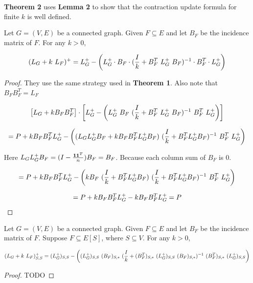 \textbf{Theorem 2} uses \textbf{Lemma 2} to show that the contraction update formula for finite $k$ is well defined. 

\begin{HXt}
 Let $G = (V, E)$ be a connected graph. Given $F \subseteq E$ and let $B_F$ be the incidence matrix of $F$. For any $k > 0$,
 
 $$ (L_G + k \ L_F)^+ = \laplacian - \left(\laplacian \cdot B_F \cdot (\frac{I}{k} + B_F^T \ \laplacian \ B_F)^{-1} \cdot B_F^T \cdot \laplacian \right)$$
 
\end{HXt}

\begin{proof}
 They use the same strategy used in \textbf{Theorem 1}. Also note that $B_F B_F^T = L_F$
 
 $$\left[L_G + k B_F B_F^T \right] \cdot \left[\laplacian - \left(\laplacian \  B_F \  (\frac{I}{k} + B_F^T \ \laplacian \ B_F)^{-1} \  B_F^T \  \laplacian \right) \right]$$

 
$$= P + k B_F B_F^T L_{G}^{+} - \left( (L_GL_{G}^{+} B_F + kB_F B_F^T L_{G}^{+} B_F)\ (\frac{I}{k} + B_F^T L_{G}^{+} B_F)^{-1} \ B_F^T \ L_{G}^{+} \right)$$

Here $L_G L_{G}^{+} B_F = (I - \frac{\textbf{1} \textbf{1}^T}{n}) B_F = B_F$. Because each column sum of $B_F$ is 0.

$$ = P + k B_F B_F^T L_{G}^{+} - \left( k B_F \ (\frac{I}{k} + B_F^T L_{G}^{+} B_F) \ (\frac{I}{k} + B_F^T L_{G}^{+} B_F)^{-1} \ B_F^T \ L_{G}^{+} \right)$$ 

$$ = P + k B_F B_F^T L_{G}^{+} - k B_F B_F^T L_{G}^{+}  = P$$
 
 \end{proof}


\begin{HXc}
 Let $G = (V, E)$ be a connected graph. Given $F \subseteq E$ and let $B_F$ be the incidence matrix of $F$. Suppose $F \subseteq E[S]$, where $S \subseteq V$. For any $k > 0$,
 
  $$ (L_G + k \ L_F)^+_{S,S} = (L_{G}^{+})_{S,S} - \left((L_{G}^{+})_{S,S} \  (B_F)_{S,*} \  (\frac{I}{k} + (B_F^T)_{S,*} \ (L_{G}^{+})_{S,S} \ (B_F)_{S,*})^{-1} \   (B_F^T)_{S,*} \  (L_{G}^{+} )_{S,S} \right)$$
 
\end{HXc}
\begin{proof}
 TODO
\end{proof}

